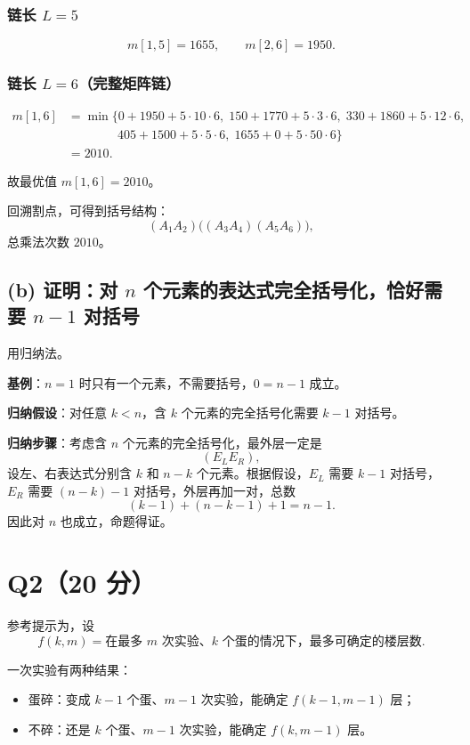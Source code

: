 \documentclass[12pt,a4paper,oneside]{ctexart}
\begin{document}
\subsubsection*{链长 $L=5$}
\[
m[1,5]=1655,\qquad
m[2,6]=1950.
\]

\subsubsection*{链长 $L=6$（完整矩阵链）}
\[
\begin{aligned}
m[1,6]&=\min\{
0+1950+5\cdot10\cdot6,\;
150+1770+5\cdot3\cdot6,\;
330+1860+5\cdot12\cdot6,\\
&\qquad\qquad 405+1500+5\cdot5\cdot6,\;
1655+0+5\cdot50\cdot6
\}\\
&=\boxed{2010}.
\end{aligned}
\]

故最优值 $m[1,6]=2010$。

回溯割点，可得到括号结构：
\[
(A_1A_2)\big((A_3A_4)(A_5A_6)\big),
\]
总乘法次数 $2010$。

\subsection*{(b) 证明：对 $n$ 个元素的表达式完全括号化，恰好需要 $n-1$ 对括号}

用归纳法。

\textbf{基例}：$n=1$ 时只有一个元素，不需要括号，$0=n-1$ 成立。

\textbf{归纳假设}：对任意 $k<n$，含 $k$ 个元素的完全括号化需要 $k-1$ 对括号。

\textbf{归纳步骤}：考虑含 $n$ 个元素的完全括号化，最外层一定是
\[
(E_L E_R),
\]
设左、右表达式分别含 $k$ 和 $n-k$ 个元素。根据假设，$E_L$ 需要 $k-1$ 对括号，
$E_R$ 需要 $(n-k)-1$ 对括号，外层再加一对，总数
\[
(k-1)+(n-k-1)+1=n-1.
\]
因此对 $n$ 也成立，命题得证。

\section*{Q2（20 分）}

参考提示为，设
\[
f(k,m)=\text{在最多 $m$ 次实验、$k$ 个蛋的情况下，最多可确定的楼层数}.
\]

一次实验有两种结果：

\begin{itemize}
\item 蛋碎：变成 $k-1$ 个蛋、$m-1$ 次实验，能确定 $f(k-1,m-1)$ 层；
\item 不碎：还是 $k$ 个蛋、$m-1$ 次实验，能确定 $f(k,m-1)$ 层。
\end{itemize}
\end{document}
